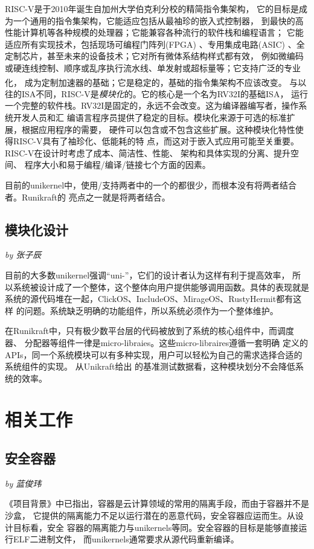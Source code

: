 \documentclass[UTF8,fontset=none,linespread=1.15]{ctexart}
\let\nosupcite\cite
\renewcommand*{\cite}[1]{\textsuperscript{\nosupcite{#1}}}
\newcommand{\sectionauthor}[1]{%
\vspace*{-5ex}
\noindent\textrm{\hfill\textit{by #1}}
\vspace*{2ex}\par}
\begin{document}
RISC-V是于2010年诞生自加州大学伯克利分校的精简指令集架构，
它的目标是成为一个通用的指令集架构，它能适应包括从最袖珍的嵌入式控制器，
到最快的高性能计算机等各种规模的处理器；它能兼容各种流行的软件栈和编程语言；
它能适应所有实现技术，包括现场可编程门阵列(FPGA)
 、专用集成电路(ASIC) 、全定制芯片，甚至未来的设备技术；它对所有微体系结构样式都有效，
例如微编码或硬连线控制、顺序或乱序执行流水线、单发射或超标量等；它支持广泛的专业化，
成为定制加速器的基础；它是稳定的，基础的指令集架构不应该改变。\cite{bib:risc-v-manual}
与以往的ISA不同，RISC-V是\textit{模块化}的。它的核心是一个名为RV32I的基础ISA，
运行一个完整的软件栈。RV32I是固定的，永远不会改变。这为编译器编写者，操作系统开发人员和汇
编语言程序员提供了稳定的目标。模块化来源于可选的标准扩展，根据应用程序的需要，
硬件可以包含或不包含这些扩展。这种模块化特性使得RISC-V具有了袖珍化、低能耗的特
点，而这对于嵌入式应用可能至关重要。RISC-V在设计时考虑了成本、简洁性、性能、
架构和具体实现的分离、提升空间、
程序大小和易于编程/编译/链接七个方面的因素。

目前的unikernel中，使用/支持两者中的一个的都很少，而根本没有将两者结合者。Runi\-kraft的
亮点之一就是将两者结合。

\subsection{模块化设计}\sectionauthor{张子辰}
目前的大多数unikernel强调“uni-”，它们的设计者认为这样有利于提高效率，
所以系统被设计成了一个整体，这个整体向用户提供能够调用函数。具体的表现就是
系统的源代码堆在一起，ClickOS、IncludeOS、MirageOS、RustyHermit都有这样
的问题。系统缺乏明确的功能组件，所以系统必须作为一个整体维护。

在Runikraft中，只有极少数平台层的代码被放到了系统的核心组件中，而调度器、
分配器等组件一律是micro-libraies。这些micro-libraires遵循一套明确
定义的APIs，同一个系统模块可以有多种实现，用户可以轻松为自己的需求选择合适的系统组件的实现。
从Unikraft给出
的基准测试数据看，这种模块划分不会降低系统的效率。

\section{相关工作}

\subsection{安全容器}\sectionauthor{蓝俊玮}
《项目背景》中已指出，容器是云计算领域的常用的隔离手段，而由于容器并不是沙盒，
它提供的隔离能力不足以运行潜在的恶意代码，安全容器应运而生。从设计目标看，安全
容器的隔离能力与unikernels等同。安全容器的目标是能够直接运行ELF二进制文件，
而unikernels通常要求从源代码重新编译。
\end{document}
